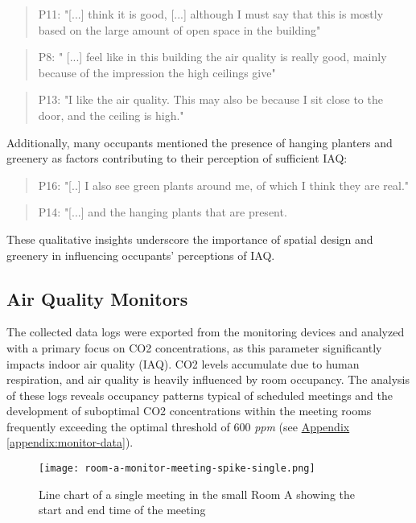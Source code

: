 \begin{quote}
P11: "[...] think it is good, [...] although I must say that this is mostly based on the large amount of open space in the building"
\end{quote}

\begin{quote}
P8: " [...] feel like in this building the air quality is really good, mainly because of the impression the high ceilings give"
\end{quote}

\begin{quote}
P13: "I like the air quality. This may also be because I sit close to the door, and the ceiling is high."
\end{quote}

Additionally, many occupants mentioned the presence of hanging planters and greenery as factors contributing to their perception of sufficient IAQ:

\begin{quote}
P16: "[..] I also see green plants around me, of which I think they are real."
\end{quote}

\begin{quote}
P14: "[...] and the hanging plants that are present.
\end{quote}

These qualitative insights underscore the importance of spatial design and greenery in influencing occupants' perceptions of IAQ.

\subsection{Air Quality Monitors}
\label{sec:monitor_analysis}

The collected data logs were exported from the monitoring devices and analyzed with a primary focus on CO2 concentrations, as this parameter significantly impacts indoor air quality (IAQ). CO2 levels accumulate due to human respiration, and air quality is heavily influenced by room occupancy. The analysis of these logs reveals occupancy patterns typical of scheduled meetings and the development of suboptimal CO2 concentrations within the meeting rooms frequently exceeding the optimal threshold of 600 \textit{ppm} (see \hyperref[appendix:monitor-data]{Appendix \ref*{appendix:monitor-data}}).

\begin{figure}[h]
    \centering
    \texttt{[image: room-a-monitor-meeting-spike-single.png]}
    \caption{Line chart of a single meeting in the small Room A showing the start and end time of the meeting}
    \label{fig:room-a-spike}
\end{figure}


